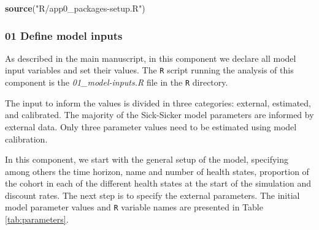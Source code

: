 \documentclass[]{article}
\newenvironment{Shaded}{\begin{snugshade}}{\end{snugshade}}
\newcommand{\KeywordTok}[1]{\textcolor[rgb]{0.13,0.29,0.53}{\textbf{#1}}}
\newcommand{\StringTok}[1]{\textcolor[rgb]{0.31,0.60,0.02}{#1}}
\newcommand{\NormalTok}[1]{#1}
\begin{document}
\begin{Shaded}
\begin{Highlighting}[]
\KeywordTok{source}\NormalTok{(}\StringTok{"R/app0_packages-setup.R"}\NormalTok{)}
\end{Highlighting}
\end{Shaded}

\subsubsection{01 Define model inputs}\label{define-model-inputs}

As described in the main manuscript, in this component we declare all
model input variables and set their values. The \texttt{R} script
running the analysis of this component is the \emph{01\_model-inputs.R}
file in the \texttt{R} directory.

The input to inform the values is divided in three categories: external,
estimated, and calibrated. The majority of the Sick-Sicker model
parameters are informed by external data. Only three parameter values
need to be estimated using model calibration.

In this component, we start with the general setup of the model,
specifying among others the time horizon, name and number of health
states, proportion of the cohort in each of the different health states
at the start of the simulation and discount rates. The next step is to
specify the external parameters. The initial model parameter values and
\texttt{R} variable names are presented in Table \ref{tab:parameters}.
\end{document}
